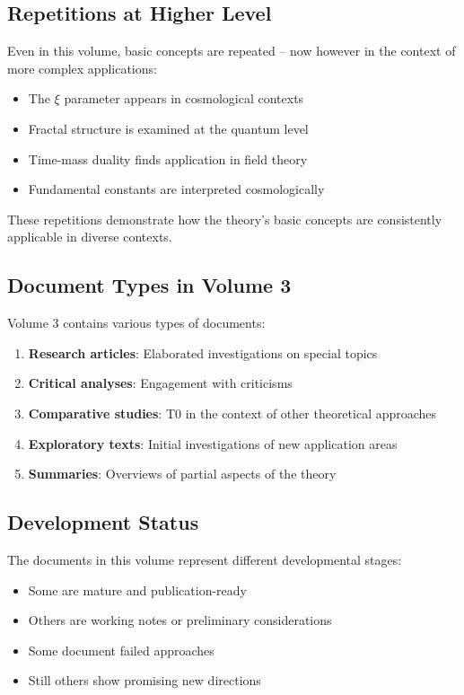 \subsection*{Repetitions at Higher Level}

Even in this volume, basic concepts are repeated -- now however in the context of more complex applications:

\begin{itemize}
\item The $\xi$ parameter appears in cosmological contexts
\item Fractal structure is examined at the quantum level
\item Time-mass duality finds application in field theory
\item Fundamental constants are interpreted cosmologically
\end{itemize}

These repetitions demonstrate how the theory's basic concepts are consistently applicable in diverse contexts.

\subsection*{Document Types in Volume 3}

Volume 3 contains various types of documents:

\begin{enumerate}
\item \textbf{Research articles}: Elaborated investigations on special topics
\item \textbf{Critical analyses}: Engagement with criticisms
\item \textbf{Comparative studies}: T0 in the context of other theoretical approaches
\item \textbf{Exploratory texts}: Initial investigations of new application areas
\item \textbf{Summaries}: Overviews of partial aspects of the theory
\end{enumerate}

\subsection*{Development Status}

The documents in this volume represent different developmental stages:

\begin{itemize}
\item Some are mature and publication-ready
\item Others are working notes or preliminary considerations
\item Some document failed approaches
\item Still others show promising new directions
\end{itemize}

